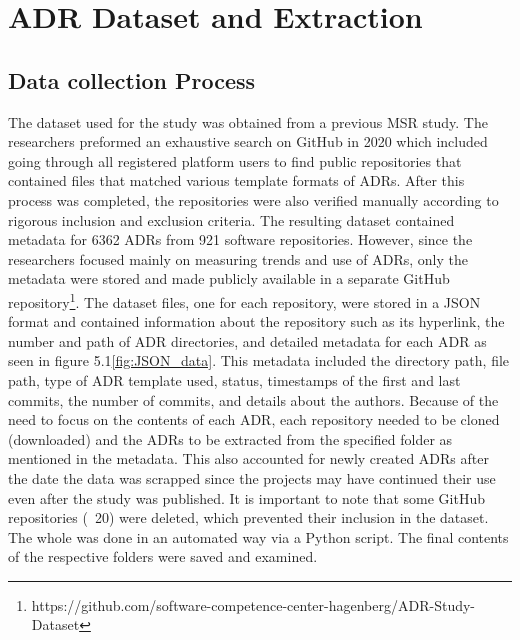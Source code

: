 \chapter{ADR Dataset and Extraction}

    \section{Data collection Process}
        The dataset used for the study was obtained from a previous MSR study\cite{Github_study_ADRs}. The researchers preformed an exhaustive search on GitHub in 2020 which included going through all registered platform users to find public repositories that contained files that matched various template formats of ADRs. After this process was completed, the repositories were also verified manually according to rigorous inclusion and exclusion criteria. The resulting dataset contained metadata for 6362 ADRs from 921 software repositories. However, since the researchers focused mainly on measuring trends and use of ADRs, only the metadata were stored and made publicly available in a separate GitHub repository\footnote{https://github.com/software-competence-center-hagenberg/ADR-Study-Dataset}. The dataset files, one for each repository, were stored in a JSON format and contained information about the repository such as its hyperlink, the number and path of ADR directories, and detailed metadata for each ADR as seen in figure 5.1\ref{fig:JSON_data}. This metadata included the directory path, file path, type of ADR template used, status, timestamps of the first and last commits, the number of commits, and details about the authors. Because of the need to focus on the contents of each ADR, each repository needed to be cloned (downloaded) and the ADRs to be extracted from the specified folder as mentioned in the metadata. This also accounted for newly created ADRs after the date the data was scrapped since the projects may have continued their use even after the study was published. It is important to note that some GitHub repositories (~20) were deleted, which prevented their inclusion in the dataset. The whole was done in an automated way via a Python script. The final contents of the respective folders were saved and examined.

